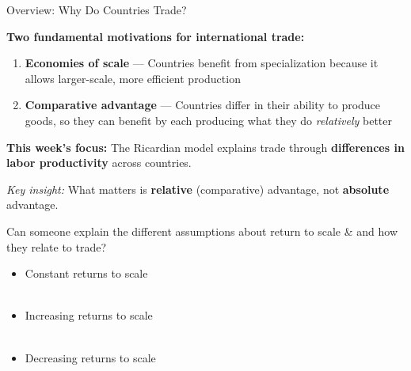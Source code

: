 \documentclass{beamer}
\begin{document}
\begin{frame}{Overview: Why Do Countries Trade?}

\textbf{Two fundamental motivations for international trade:}

\begin{enumerate}
    \item \textbf{Economies of scale} --- Countries benefit from specialization because it allows larger-scale, more efficient production \\[0.5cm]
    
    \item \textbf{Comparative advantage} --- Countries differ in their ability to produce goods, so they can benefit by each producing what they do \textit{relatively} better
\end{enumerate}

\vspace{0.5cm}

\textbf{This week's focus:} The Ricardian model explains trade through \textbf{differences in labor productivity} across countries.

\vspace{0.3cm}

\textit{Key insight:} What matters is \textbf{relative} (comparative) advantage, not \textbf{absolute} advantage.

\end{frame}

\begin{frame}{Can someone explain the different assumptions about return to scale \& and how they relate to trade?}

\begin{itemize}
    \item Constant returns to scale \\~\\
    \item Increasing returns to scale \\~\\
    \item Decreasing returns to scale
\end{itemize}
\end{frame}


\end{document}
